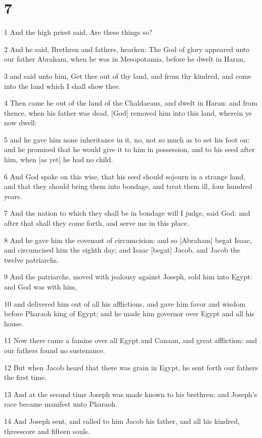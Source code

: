\chapter{7}

\par 1 And the high priest said, Are these things so?
\par 2 And he said, Brethren and fathers, hearken: The God of glory appeared unto our father Abraham, when he was in Mesopotamia, before he dwelt in Haran,
\par 3 and said unto him, Get thee out of thy land, and from thy kindred, and come into the land which I shall show thee.
\par 4 Then came he out of the land of the Chaldaeans, and dwelt in Haran: and from thence, when his father was dead, [God] removed him into this land, wherein ye now dwell:
\par 5 and he gave him none inheritance in it, no, not so much as to set his foot on: and he promised that he would give it to him in possession, and to his seed after him, when [as yet] he had no child.
\par 6 And God spake on this wise, that his seed should sojourn in a strange land, and that they should bring them into bondage, and treat them ill, four hundred years.
\par 7 And the nation to which they shall be in bondage will I judge, said God: and after that shall they come forth, and serve me in this place.
\par 8 And he gave him the covenant of circumcision: and so [Abraham] begat Isaac, and circumcised him the eighth day; and Isaac [begat] Jacob, and Jacob the twelve patriarchs.
\par 9 And the patriarchs, moved with jealousy against Joseph, sold him into Egypt: and God was with him,
\par 10 and delivered him out of all his afflictions, and gave him favor and wisdom before Pharaoh king of Egypt; and he made him governor over Egypt and all his house.
\par 11 Now there came a famine over all Egypt and Canaan, and great affliction: and our fathers found no sustenance.
\par 12 But when Jacob heard that there was grain in Egypt, he sent forth our fathers the first time.
\par 13 And at the second time Joseph was made known to his brethren; and Joseph's race became manifest unto Pharaoh.
\par 14 And Joseph sent, and called to him Jacob his father, and all his kindred, threescore and fifteen souls.
